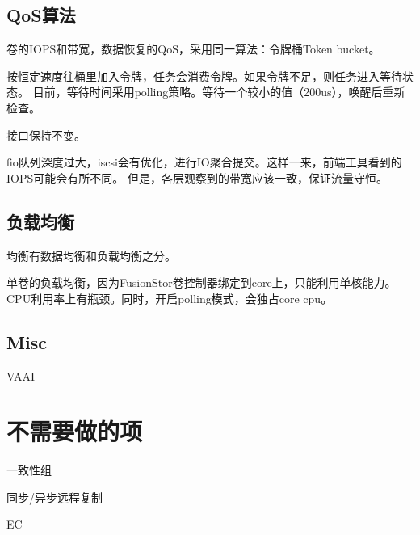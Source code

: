\subsection{QoS算法}

卷的IOPS和带宽，数据恢复的QoS，采用同一算法：令牌桶Token bucket。

按恒定速度往桶里加入令牌，任务会消费令牌。如果令牌不足，则任务进入等待状态。
目前，等待时间采用polling策略。等待一个较小的值（200us），唤醒后重新检查。

接口保持不变。

\begin{tcolorbox}
fio队列深度过大，iscsi会有优化，进行IO聚合提交。这样一来，前端工具看到的IOPS可能会有所不同。
但是，各层观察到的带宽应该一致，保证流量守恒。
\end{tcolorbox}

\subsection{负载均衡}

均衡有数据均衡和负载均衡之分。

单卷的负载均衡，因为FusionStor卷控制器绑定到core上，只能利用单核能力。
CPU利用率上有瓶颈。同时，开启polling模式，会独占core cpu。

\subsection{Misc}

VAAI

\section{不需要做的项}

\begin{enumbox}
\item 一致性组
\item 同步/异步远程复制
\item EC
\end{enumbox}
